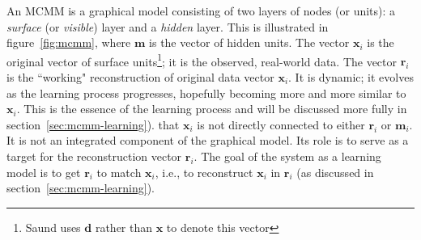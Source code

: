 An MCMM is a graphical model consisting of two layers of nodes (or units): a \emph{surface} (or \emph{visible}) 
layer and a \emph{hidden} layer.
This is illustrated in figure~\ref{fig:mcmm}, where $\mathbf{m}$ 
is the vector of hidden units. The vector $\mathbf{x}_i$ is the 
original vector of surface units\footnote{Saund uses $\mathbf{d}$ 
rather than $\mathbf{x}$ to denote this vector}; it is the observed, 
real-world data. The vector $\mathbf{r}_i$ is the ``working" 
reconstruction of original data vector $\textbf{x}_i$. It is dynamic; 
it evolves as the learning process progresses, hopefully 
becoming more and more similar to $\mathbf{x}_i$. 
This is the essence of the learning process and will be 
discussed more fully in section~\ref{sec:mcmm-learning}).
that $\mathbf{x}_i$ is not directly connected to either $\mathbf{r}_i$ 
or $\mathbf{m}_i$. It is not an integrated component of the graphical 
model. Its role is to serve as a target for the reconstruction vector $\mathbf{r}_i$. 
The goal of the system as a learning model is to get $\mathbf{r}_i$ to 
match $\mathbf{x}_i$, i.e., to reconstruct $\mathbf{x}_i$ in 
$\mathbf{r}_i$ (as discussed in section~\ref{sec:mcmm-learning}).

